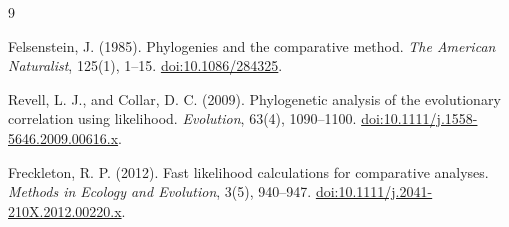 \documentclass[10pt]{article}
\begin{document}
\begin{thebibliography}{9}

Felsenstein, J. (1985).
Phylogenies and the comparative method.
\textit{The American Naturalist}, 125(1), 1--15.
\href{https://doi.org/10.1086/284325}{doi:10.1086/284325}.

Revell, L. J., and Collar, D. C. (2009).
Phylogenetic analysis of the evolutionary correlation using likelihood.
\textit{Evolution}, 63(4), 1090--1100.
\href{https://doi.org/10.1111/j.1558-5646.2009.00616.x}%
{doi:10.1111/j.1558-5646.2009.00616.x}.

Freckleton, R. P. (2012).
Fast likelihood calculations for comparative analyses.
\textit{Methods in Ecology and Evolution}, 3(5), 940--947.
\href{https://doi.org/10.1111/j.2041-210X.2012.00220.x}%
{doi:10.1111/j.2041-210X.2012.00220.x}.

\end{thebibliography}
\end{document}
